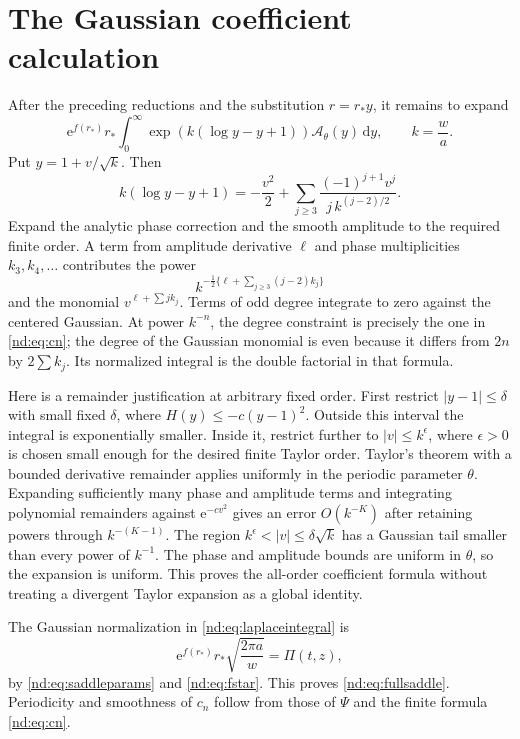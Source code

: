 \documentclass[11pt,a4paper,oneside,openany]{book}
\numberwithin{equation}{chapter}
\theoremstyle{definition}
\theoremstyle{remark}
\newcommand{\dd}{\,\mathrm d}
\newcommand{\e}{\mathrm e}
\begin{document}
\section{The Gaussian coefficient calculation}
After the preceding reductions and the substitution \(r=r_*y\), it remains
to expand
\begin{equation}
 \e^{f(r_*)}r_*
 \int_0^\infty\exp\left(k(\log y-y+1)\right)
                         \mathcal A_\theta(y)\dd y,
 \qquad k=\frac wa.
 \label{nd:eq:laplaceintegral}
\end{equation}
Put \(y=1+v/\sqrt k\). Then
\begin{equation}
 k(\log y-y+1)
 =-\frac{v^2}{2}+
       \sum_{j\ge3}\frac{(-1)^{j+1}v^j}{j\,k^{(j-2)/2}}.
 \label{nd:eq:phaseexpansion}
\end{equation}
Expand the analytic phase correction and the smooth amplitude to the required
finite order. A term from amplitude derivative \(\ell\) and phase
multiplicities \(k_3,k_4,\ldots\) contributes the power
\[
 k^{-\frac12\{\ell+\sum_{j\ge3}(j-2)k_j\}}
\]
and the monomial \(v^{\ell+\sum j k_j}\). Terms of odd degree integrate to
zero against the centered Gaussian. At power \(k^{-n}\), the degree constraint
is precisely the one in \eqref{nd:eq:cn}; the degree of the Gaussian monomial is
even because it differs from \(2n\) by \(2\sum k_j\). Its normalized integral
is the double factorial in that formula.

Here is a remainder justification at arbitrary fixed order. First restrict
\(|y-1|\le\delta\) with small fixed \(\delta\), where \(H(y)\le-c(y-1)^2\).
Outside this interval the integral is exponentially smaller. Inside it,
restrict further to \(|v|\le k^\epsilon\), where \(\epsilon>0\) is chosen
small enough for the desired finite Taylor order. Taylor's theorem with a
bounded derivative remainder applies uniformly in the periodic parameter
\(\theta\). Expanding sufficiently many phase and amplitude terms and
integrating polynomial remainders against \(\e^{-c v^2}\) gives an error
\(O(k^{-K})\) after retaining powers through \(k^{-(K-1)}\). The region
\(k^\epsilon<|v|\le\delta\sqrt k\) has a Gaussian tail smaller than every
power of \(k^{-1}\). The phase and amplitude bounds are uniform in \(\theta\),
so the expansion is uniform. This proves the all-order coefficient formula
without treating a divergent Taylor expansion as a global identity.

The Gaussian normalization in \eqref{nd:eq:laplaceintegral} is
\[
 \e^{f(r_*)}r_*\sqrt{\frac{2\pi a}{w}}=\Pi(t,z),
\]
by \eqref{nd:eq:saddleparams} and \eqref{nd:eq:fstar}. This proves
\eqref{nd:eq:fullsaddle}. Periodicity and smoothness of \(c_n\) follow from those
of \(\Psi\) and the finite formula \eqref{nd:eq:cn}.
\end{document}
